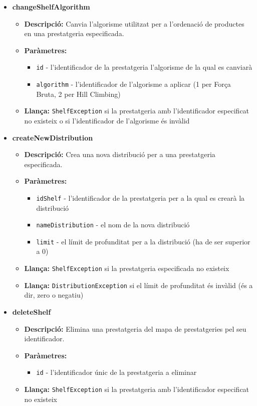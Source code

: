 \documentclass[a4paper, t]{article}
\begin{document}
\begin{itemize}
    \item \textbf{changeShelfAlgorithm}
    \begin{itemize}
        \item \textbf{Descripció:} Canvia l'algorisme utilitzat per a l'ordenació de productes en una prestatgeria especificada.
        \item \textbf{Paràmetres:}
        \begin{itemize}
            \item \texttt{id} - l'identificador de la prestatgeria l'algorisme de la qual es canviarà
            \item \texttt{algorithm} - l'identificador de l'algorisme a aplicar (1 per Força Bruta, 2 per Hill Climbing)
        \end{itemize}
        \item \textbf{Llança:} \texttt{ShelfException} si la prestatgeria amb l'identificador especificat no existeix o si l'identificador de l'algorisme és invàlid
    \end{itemize}

    \item \textbf{createNewDistribution}
    \begin{itemize}
        \item \textbf{Descripció:} Crea una nova distribució per a una prestatgeria especificada.
        \item \textbf{Paràmetres:}
        \begin{itemize}
            \item \texttt{idShelf} - l'identificador de la prestatgeria per a la qual es crearà la distribució
            \item \texttt{nameDistribution} - el nom de la nova distribució
            \item \texttt{limit} - el límit de profunditat per a la distribució (ha de ser superior a 0)
        \end{itemize}
        \item \textbf{Llança:} \texttt{ShelfException} si la prestatgeria especificada no existeix
        \item \textbf{Llança:} \texttt{DistributionException} si el límit de profunditat és invàlid (és a dir, zero o negatiu)
    \end{itemize}

    \item \textbf{deleteShelf}
    \begin{itemize}
        \item \textbf{Descripció:} Elimina una prestatgeria del mapa de prestatgeries pel seu identificador.
        \item \textbf{Paràmetres:}
        \begin{itemize}
            \item \texttt{id} - l'identificador únic de la prestatgeria a eliminar
        \end{itemize}
        \item \textbf{Llança:} \texttt{ShelfException} si la prestatgeria amb l'identificador especificat no existeix
    \end{itemize}
\end{itemize}
\end{document}
